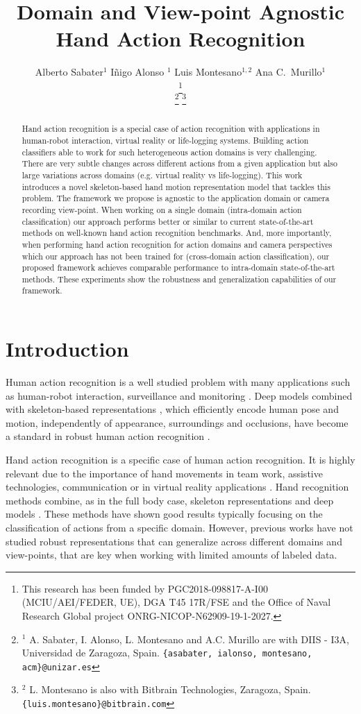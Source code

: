 \documentclass[letterpaper, 10 pt, conference]{ieeeconf}
\title{\LARGE \bf
Domain and View-point Agnostic Hand Action Recognition
}
\author{Alberto Sabater$^{1}$ \hspace{0.5cm} Iñigo Alonso $^{1}$ \hspace{0.5cm} Luis Montesano$^{1,2}$ \hspace{0.5cm} Ana C.~Murillo$^{1}$

\thanks{This research has been funded by PGC2018-098817-A-I00 (MCIU/AEI/FEDER, UE), DGA T45 17R/FSE and the Office of Naval Research Global project ONRG-NICOP-N62909-19-1-2027.}

\thanks{$^{1}$ A. Sabater, I. Alonso, L. Montesano and A.C. Murillo are with 
DIIS - I3A, Universidad de Zaragoza, Spain. {\tt\small \{asabater, ialonso, montesano, acm\}@unizar.es}}
\thanks{$^{2}$  L. Montesano is also with Bitbrain Technologies, Zaragoza, Spain. {\tt\small \{luis.montesano\}@bitbrain.com}}
}
\begin{document}
\maketitle
\thispagestyle{empty}
\pagestyle{empty}


\begin{abstract}
Hand action recognition is a special case of action recognition with applications in human-robot interaction, virtual reality or life-logging systems. Building action classifiers able to work for such heterogeneous action domains is very challenging. There are very subtle changes across different actions from a given application but also large variations across domains (e.g. virtual reality vs life-logging). This work introduces a novel skeleton-based hand motion representation model that tackles this problem. The framework we propose is agnostic to the application domain or camera recording view-point. When working on a single domain (intra-domain action classification) our approach performs better or similar to current state-of-the-art methods on well-known hand action recognition benchmarks. And, more importantly, when performing hand action recognition for action domains and camera perspectives which our approach has not been trained for (cross-domain action classification), our proposed framework achieves comparable performance to intra-domain state-of-the-art methods. These experiments show the robustness and generalization capabilities of our framework.


\end{abstract}

    


\section{Introduction}
Human action recognition is a well studied problem with many applications such as human-robot interaction, surveillance and monitoring \cite{krupke2018comparison, tanwani2017generative}. Deep models combined with skeleton-based representations \cite{moon2018v2v, xiong2019a2j}, which efficiently encode human pose and motion, independently of appearance, surroundings and occlusions, have become a standard in robust human action recognition \cite{perez2019interaction, zhang2019view}.

Hand action recognition is a specific case of human action recognition. It is highly relevant due to the importance of hand movements in team work, assistive technologies, communication or in virtual reality applications \cite{abbasi2019multimodal, bates2017line}. 
Hand recognition methods combine, as in the full body case, skeleton representations and deep models \cite{yang2019make, zhang2016efficient}. These methods have shown good results typically focusing  on the classification of actions from a specific domain.
However, previous works have not studied robust representations that can generalize across different domains and view-points, that are key when working with limited amounts of labeled data.  
\end{document}
